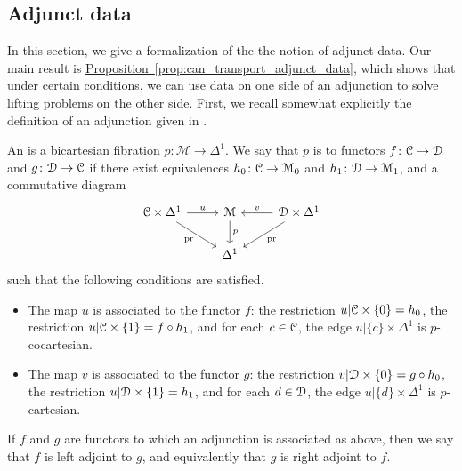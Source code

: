 \documentclass[main.tex]{subfiles}
\begin{document}
\subsection{Adjunct data}
\label{ssc:adjunct_data}

In this section, we give a formalization of the the notion of adjunct data. Our main result is \hyperref[prop:can_transport_adjunct_data]{Proposition~\ref*{prop:can_transport_adjunct_data}}, which shows that under certain conditions, we can use data on one side of an adjunction to solve lifting problems on the other side. First, we recall somewhat explicitly the definition of an adjunction given in \cite{highertopostheory}.

\begin{definition}
  \label{def:adjunction}
  An  is a bicartesian fibration $p\colon \mathcal{M} \to \Delta^{1}$. We say that $p$ is  to functors $f\colon \mathcal{C} \to \mathcal{D}$ and $g\colon \mathcal{D} \to \mathcal{C}$ if there exist equivalences $h_{0}\colon \mathcal{C} \to \mathcal{M}_{0}$ and $h_{1}\colon \mathcal{D} \to \mathcal{M}_{1}$, and a commutative diagram
  \begin{equation*}
    \begin{tikzcd}
      \category{C} \times \Delta^{1}
      \arrow[r, "u"]
      \arrow[dr, swap, "\pr"]
      & \mathcal{M}
      \arrow[d, "p"]
      & \category{D} \times \Delta^{1}
      \arrow[l, swap, "v"]
      \arrow[dl, "\pr"]
      \\
      & \Delta^{1}
    \end{tikzcd}
  \end{equation*}
  such that the following conditions are satisfied.
  \begin{itemize}
    \item The map $u$ is associated to the functor $f$: the restriction $u|\mathcal{C} \times \{0\} = h_{0}$, the restriction $u|\mathcal{C} \times \{1\} = f \circ h_{1}$, and for each $c \in \mathcal{C}$, the edge $u|\{c\} \times \Delta^{1}$ is $p$-cocartesian.

    \item The map $v$ is associated to the functor $g$: the restriction $v|\mathcal{D} \times \{0\} = g \circ h_{0}$, the restriction $u|\mathcal{D} \times \{1\} = h_{1}$, and for each $d \in \mathcal{D}$, the edge $u|\{d\} \times \Delta^{1}$ is $p$-cartesian.
  \end{itemize}

  If $f$ and $g$ are functors to which an adjunction is associated as above, then we say that $f$ is left adjoint to $g$, and equivalently that $g$ is right adjoint to $f$.
\end{definition}
\end{document}
